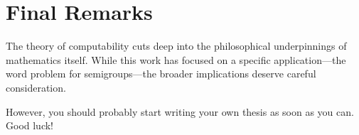 \chapter*{Final Remarks}


The theory of computability cuts deep into the philosophical
underpinnings of mathematics itself. While this work has focused
on a specific application---the word problem for semigroups---the
broader implications deserve careful consideration.

However, you should probably start writing your own thesis as
soon as you can. Good luck!

\lipsum[1-4]

